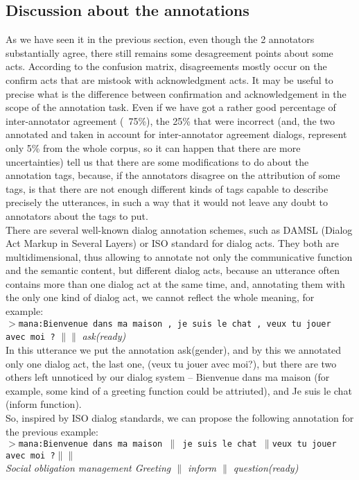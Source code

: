\documentclass[a4paper]{article}
\begin{document}
\subsection{Discussion about the annotations}
    As we have seen it in the previous section, even though the 2 annotators substantially agree, there still remains some desagreement points about some acts.
According to the confusion matrix, disagreements mostly occur on the confirm acts that are mistook with acknowledgment acts. It may be useful to precise what is the difference between confirmation and acknowledgement in the scope of the annotation task.
Even if we have got a rather good percentage of inter-annotator agreement (~75\%), the 25\% that were incorrect (and, the two annotated and taken in account for inter-annotator agreement dialogs, represent only 5\% from the whole corpus, so it can happen that there are more uncertainties) tell us that there are some modifications to do about the annotation tags, because, if the annotators disagree on the attribution of some tags, is that there are not enough different kinds of tags capable to describe precisely the utterances, in such a way that it would not leave any doubt to annotators about the tags to put.\\

There are several well-known dialog annotation schemes, such as DAMSL (Dialog Act Markup in Several Layers) or ISO standard for dialog acts. They both are multidimensional, thus allowing to annotate not only the communicative function and the semantic content, but different dialog acts, because an utterance often contains more than one dialog act at the same time, and, annotating them with the only one kind of dialog act, we cannot reflect the whole meaning, for example:\\
$>$\texttt{mana:Bienvenue dans ma maison , je suis le chat , veux tu jouer avec moi ?} $\|\|$ \emph{\small ask(ready)}\\
In this utterance we put the annotation ask(gender), and by this we annotated only one dialog act, the last one, (veux tu jouer avec moi?), but there are two others left unnoticed by our dialog system – Bienvenue dans ma maison (for example, some kind of a greeting function could be attriuted), and Je suis le chat (inform function).\\

So, inspired by ISO dialog standards, we can propose the following annotation for the previous example:\\
$>$\texttt{mana:Bienvenue dans ma maison $\|$  je suis le chat $\|$veux tu jouer avec moi ?}$\|\|$\\
\emph{\small Social obligation management Greeting $\|$ inform $\|$ question(ready)}\\
\end{document}
